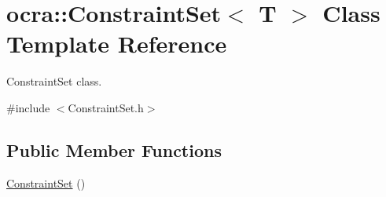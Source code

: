 \hypertarget{classocra_1_1ConstraintSet}{}\section{ocra\+:\+:Constraint\+Set$<$ T $>$ Class Template Reference}
\label{classocra_1_1ConstraintSet}


Constraint\+Set class.  




{\ttfamily \#include $<$Constraint\+Set.\+h$>$}

\subsection*{Public Member Functions}
\begin{DoxyCompactItemize}
\item 
\hyperlink{classocra_1_1ConstraintSet_ae571e7cc71dd7a2cfd3e8eeac028f65c}{Constraint\+Set} ()
\end{DoxyCompactItemize}
{\bf }\par
